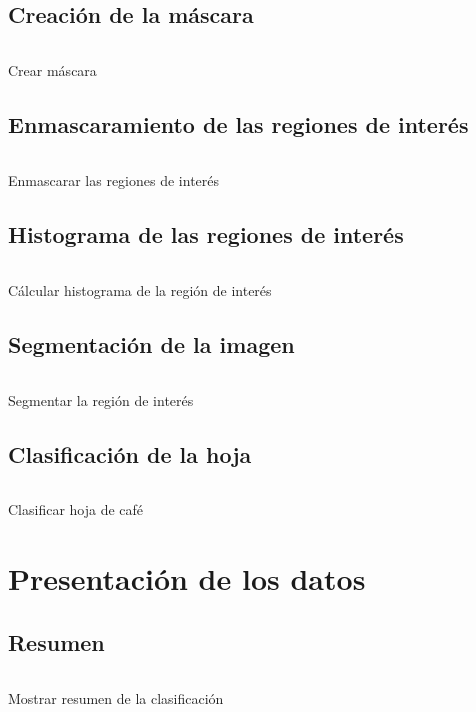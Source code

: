 \subsection{Creación de la máscara}
\begin{listing}[!ht]
\inputminted{python}{code_listings/mask.py}
\caption{Crear máscara}
\label{code:mask}
\end{listing}

\subsection{Enmascaramiento de las regiones de interés}
\begin{listing}[!ht]
\inputminted{python}{code_listings/masked_roi.py}
\caption{Enmascarar las regiones de interés}
\label{code:masked_roi}
\end{listing}

\subsection{Histograma de las regiones de interés}
\begin{listing}[!ht]
\inputminted{python}{code_listings/histogram.py}
\caption{Cálcular histograma de la región de interés}
\label{code:histogram}
\end{listing}

\subsection{Segmentación de la imagen}
\begin{listing}[!ht]
\inputminted{python}{code_listings/segmentation.py}
\caption{Segmentar la región de interés}
\label{code:segmentation}
\end{listing}

\subsection{Clasificación de la hoja}
\begin{listing}[!ht]
\inputminted{python}{code_listings/categorize.py}
\caption{Clasificar hoja de café}
\label{code:categorize}
\end{listing}

\section{Presentación de los datos}

\subsection{Resumen}
\begin{listing}[!ht]
\inputminted{python}{code_listings/show_summary.py}
\caption{Mostrar resumen de la clasificación}
\label{code:show_summary}
\end{listing}

